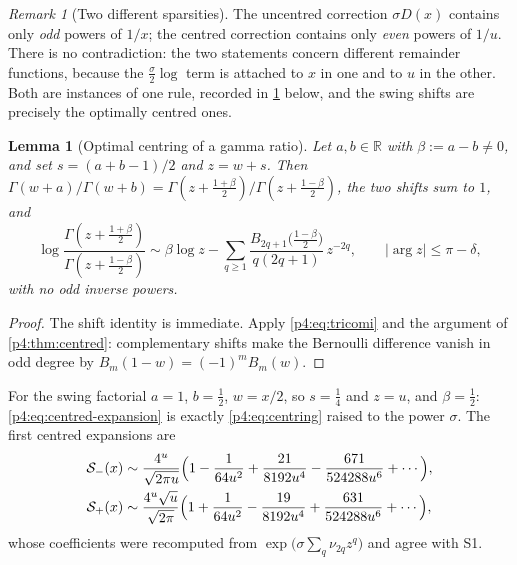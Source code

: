 \documentclass[11pt,a4paper,oneside]{book}
\theoremstyle{plain}
\newtheorem{lemma}[theorem]{Lemma}
\theoremstyle{definition}
\theoremstyle{remark}
\newtheorem{remark}[theorem]{Remark}
\newcommand{\Real}{\mathbb{R}}
\begin{document}
\begin{remark}[Two different sparsities]
\label{p4:rem:two-sparsities}
The uncentred correction $\sigma D(x)$ contains only \emph{odd} powers of
$1/x$; the centred correction contains only \emph{even} powers of $1/u$.
There is no contradiction: the two statements concern different remainder
functions, because the $\tfrac\sigma2\log$ term is attached to $x$ in one and
to $u$ in the other.  Both are instances of one rule, recorded in
\cref{p4:lem:centring} below, and the swing shifts are precisely the
optimally centred ones.
\end{remark}

\begin{lemma}[Optimal centring of a gamma ratio]
\label{p4:lem:centring}
Let $a,b\in\Real$ with $\beta:=a-b\ne0$, and set $s=(a+b-1)/2$ and $z=w+s$.
Then $\Gamma(w+a)/\Gamma(w+b)=\Gamma(z+\tfrac{1+\beta}2)/
\Gamma(z+\tfrac{1-\beta}2)$, the two shifts sum to $1$, and
\begin{equation}
  \log\frac{\Gamma(z+\frac{1+\beta}2)}{\Gamma(z+\frac{1-\beta}2)}
  \sim\beta\log z-\sum_{q\ge1}
   \frac{B_{2q+1}\bigl(\frac{1-\beta}2\bigr)}{q(2q+1)}\,z^{-2q},
  \qquad |\arg z|\le\pi-\delta,
  \label{p4:eq:centring}
\end{equation}
with no odd inverse powers.
\end{lemma}

\begin{proof}
The shift identity is immediate.  Apply \cref{p4:eq:tricomi} and the argument
of \cref{p4:thm:centred}: complementary shifts make the Bernoulli difference
vanish in odd degree by $B_m(1-w)=(-1)^mB_m(w)$.
\end{proof}

For the swing factorial $a=1$, $b=\tfrac12$, $w=x/2$, so $s=\tfrac14$ and
$z=u$, and $\beta=\tfrac12$: \cref{p4:eq:centred-expansion} is exactly
\cref{p4:eq:centring} raised to the power $\sigma$.  The first centred
expansions are
\begin{align}
  \mathcal S_-(x)&\sim\frac{4^{u}}{\sqrt{2\pi u}}
  \Bigl(1-\frac1{64u^{2}}+\frac{21}{8192u^{4}}
   -\frac{671}{524288u^{6}}+\cdots\Bigr),
  \label{p4:eq:centred-even}\\
  \mathcal S_+(x)&\sim\frac{4^{u}\sqrt u}{\sqrt{2\pi}}
  \Bigl(1+\frac1{64u^{2}}-\frac{19}{8192u^{4}}
   +\frac{631}{524288u^{6}}+\cdots\Bigr),
  \label{p4:eq:centred-odd}
\end{align}
whose coefficients were recomputed from
$\exp\bigl(\sigma\sum_q\nu_{2q}z^{q}\bigr)$ and agree with \textsf{S1}.
\end{document}

